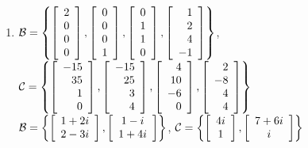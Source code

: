 \begin{enumerate}[!HW!]
\itemspade $\mathcal{B} = \left\{\vr{1\\2\\3\\4}, \vr{-5\\0\\0\\7}, \vr{1\\1\\2\\2}, \vr{-1\\-1\\-2\\5}\right\}$, $\mathcal{C} = \left\{\vr{-52\\1\\-1\\72}, \vr{-20\\2\\2\\88}, \vr{-6\\-3\\-9\\29}, \vr{3\\5\\3\\52}\right\}$
\item $\mathcal{B} = \left\{\vr{2\\0\\0\\0}, \vr{0\\0\\0\\1}, \vr{0\\1\\1\\0}, \vr{1\\2\\4\\-1}\right\}$, $\mathcal{C} = \left\{\vr{-15\\35\\1\\0}, \vr{-15\\25\\3\\4}, \vr{4\\10\\-6\\0}, \vr{2\\-8\\4\\4}\right\}$ %
\itemspade $\mathcal{B} = \left\{\mtx{c}{1+2i \\ 2-3i}, \mtx{c}{1-i\\1+4i}\right\}$, $\mathcal{C} = \left\{\mtx{c}{4i\\1}, \mtx{c}{7+6i\\i}\right\}$

\end{enumerate}
